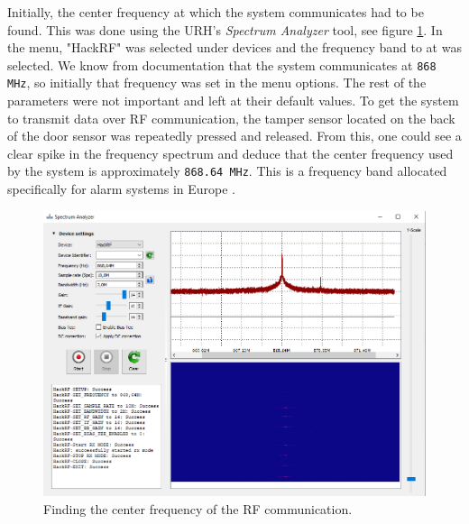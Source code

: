 Initially, the center frequency at which the system communicates had to be found. This was done using the URH's \textit{Spectrum Analyzer} tool, see figure \ref{fig:finding-center-freq}. In the menu, "HackRF" was selected under devices and the frequency band to at was selected. We know from documentation that the system communicates at \texttt{868 MHz}, so initially that frequency was set in the menu options. The rest of the parameters were not important and left at their default values. To get the system to transmit data over RF communication, the tamper sensor located on the back of the door sensor was repeatedly pressed and released. From this, one could see a clear spike in the frequency spectrum and deduce that the center frequency used by the system is approximately \texttt{868.64 MHz}. This is a frequency band allocated specifically for alarm systems in Europe .
\begin{figure}[!ht]
    \centering
    \includegraphics[width=\textwidth]{images/6-pentesting/find-frequency.png}
    \caption{Finding the center frequency of the RF communication.}
    \label{fig:finding-center-freq}
\end{figure}

